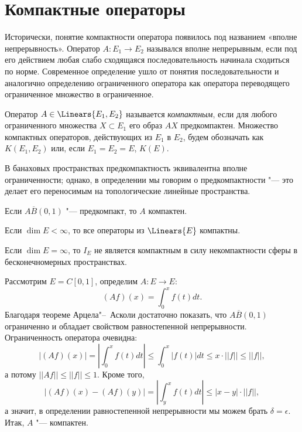 \documentclass[main]{subfiles}
\begin{document}
\section{Компактные операторы}

Исторически, понятие компактности оператора
появилось под названием «вполне непрерывность».
Оператор \( A : E_1 \to E_2 \)
назывался вполне непрерывным, если
под его действием любая слабо сходящаяся последовательность
начинала сходиться по норме.
Современное определение ушло от понятия последовательности
и аналогично определению ограниченного оператора
как оператора переводящего ограниченное множество в ограниченное.

\begin{definition}
  Оператор \( A \in \Linears{E_1, E_2} \)
  называется \emph{компактным}, если
  для любого ограниченного множества \( X \subset E_1 \)
  его образ \( A X \) предкомпактен.
  Множество компактных операторов, действующих
  из \( E_1 \) в \( E_2 \), будем обозначать как
  \( K(E_1, E_2) \) или, если \( E_1 = E_2 = E \),
  \( K(E) \).
\end{definition}

\begin{remark}
  В банаховых пространствах
  предкомпактность эквивалентна вполне ограниченности;
  однако, в определении мы говорим о предкомпактности "---
  это делает его переносимым на топологические линейные пространства.
\end{remark}

\begin{exercise}
  Если \( A \overline{B}(0, 1) \) "--- предкомпакт,
  то \( A \) компактен.
\end{exercise}

\begin{exampleslist}
  \item Если \( \dim E < \infty \), то все операторы из
    \( \Linears{E} \) компактны.
  \item Если \( \dim E = \infty \), то \( I_E \) не является компактным
    в силу некомпактности сферы в бесконечномерных пространствах.
  \item
    Рассмотрим \( E = C[0, 1] \), определим \( A : E \to E \):
    \[
      (Af)(x) = \int_0^x f(t) dt.
    \]
    Благодаря теореме Арцела"--~Асколи достаточно показать, что
    \( A \overline{B}(0, 1) \) ограниченно и обладает
    свойством равностепенной непрерывности.
    Ограниченность оператора очевидна:
    \[
      |(Af)(x)| = |\int_0^x f(t) dt| \le
      \int_0^x |f(t)| dt \le x \cdot ||f|| \le ||f||,
    \]
    а потому \( ||Af|| \le ||f|| \le 1 \).
    Кроме того,
    \[
      |(Af)(x) - (Af)(y)| =
      \left|\int_y^x f(t) dt \right| \le |x - y| \cdot ||f||,
    \]
    а значит, в определении равностепенной непрерывности
    мы можем брать \( \delta = \epsilon \).
    Итак, \( A \) "--- компактен.
\end{exampleslist}
\end{document}
